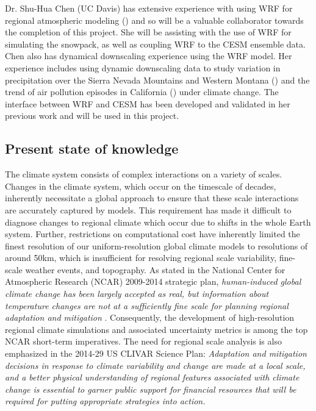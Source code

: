\documentclass[11pt]{article}
\begin{document}
Dr. Shu-Hua Chen (UC Davis) has extensive experience with using WRF for regional atmospheric modeling (\cite{chen2011observing,xu2014coupling, yang2014evaluating, zhang2014development}) and so will be a valuable collaborator towards the completion of this project. She will be assisting with the use of WRF for simulating the snowpack, as well as coupling WRF to the CESM ensemble data.  Chen also has dynamical downscaling experience using the WRF model. Her experience includes using dynamic downscaling data to study variation in precipitation over the Sierra Nevada Mountains and Western Montana (\cite{pan2011influences, silverman2013dynamically}) and the trend of air pollution episodes in California (\cite{zhao2011impactb, zhao2011impacta}) under climate change. The interface between WRF and CESM has been developed and validated in her previous work and will be used in this project.


\subsection{Present state of knowledge}

The climate system consists of complex interactions on a variety of scales. Changes in the climate system, which occur on the timescale of decades, inherently necessitate a global approach to ensure that these scale interactions are accurately captured by models. This requirement has made it difficult to diagnose changes to regional climate which occur due to shifts in the whole Earth system. Further, restrictions on computational cost have inherently limited the finest resolution of our uniform-resolution global climate models to resolutions of around 50km, which is insufficient for resolving regional scale variability, fine-scale weather events, and topography. As stated in the National Center for Atmospheric Research (NCAR) 2009-2014 strategic plan, \textit{human-induced global climate change has been largely accepted as real, but information about temperature changes are not at a sufficiently fine scale for planning regional adaptation and mitigation} \citep{NCAR2009}. Consequently, the development of high-resolution regional climate simulations and associated uncertainty metrics is among the top NCAR short-term imperatives.  The need for regional scale analysis is also emphasized in the 2014-29 US CLIVAR Science Plan: \textit{Adaptation and mitigation decisions in response to climate variability and change are made at a local scale, and a better physical understanding of regional features associated with climate change is essential to garner public support for financial resources that will be required for putting appropriate strategies into action.}
\end{document}
